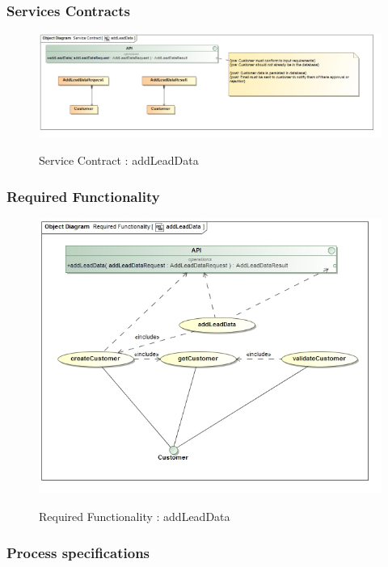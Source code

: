 \documentclass{article}
\begin{document}
		\subsubsection{Services Contracts}

		\begin{figure}[H]
		\includegraphics[width=\textwidth]{images/obj__Service_Contract__addLeadData.jpg}  \\
		\caption{Service Contract : addLeadData}
		\end{figure}

		\subsubsection{Required Functionality}

		\begin{figure}[H]
		\includegraphics[width=\textwidth]{images/obj__Required_Functionality__addLeadData.jpg}  \\
		\caption{Required Functionality : addLeadData}
		\end{figure}

		\subsubsection{Process specifications}
\end{document}
